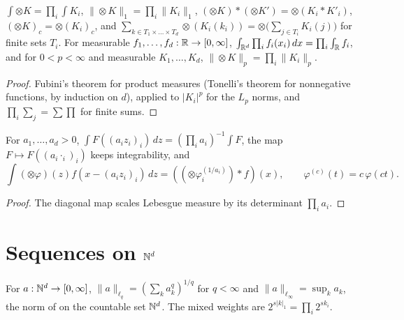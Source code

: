 \begin{lemma}
\label{lem:tensor-kernel-fubini}
\leanok
{}
$\int \otimes K = \prod_i \int K_i$, $\|\otimes K\|_1 = \prod_i \|K_i\|_1$,
$(\otimes K) * (\otimes K') = \otimes (K_i * K'_i)$, $(\otimes K)_c = \otimes (K_i)_c$, and
$\sum_{k \in T_1 \times \dots \times T_d} \otimes (K_i(k_i)) = \otimes \bigl(\sum_{j \in T_i} K_i(j)\bigr)$
for finite sets $T_i$. For measurable $f_1, \dots, f_d : \mathbb{R} \to [0, \infty]$,
$\int_{\mathbb{R}^d} \prod_i f_i(x_i) \, dx = \prod_i \int_{\mathbb{R}} f_i$, and for $0 < p < \infty$ and
measurable $K_1, \dots, K_d$, $\|\otimes K\|_p = \prod_i \|K_i\|_p$.
\end{lemma}

\begin{proof}
\leanok
Fubini's theorem for product measures (Tonelli's theorem for nonnegative functions, by
induction on $d$), applied to $|K_i|^p$ for the $L_p$ norms, and $\prod_i \sum_j = \sum \prod$
for finite sums.
\end{proof}

\begin{lemma}
\label{lem:diagonal-substitution}
\leanok
{}
For $a_1, \dots, a_d > 0$, $\int F((a_i z_i)_i) \, dz = (\prod_i a_i)^{-1} \int F$, the map
$F \mapsto F((a_i \cdot_i)_i)$ keeps integrability, and
\[
  \int (\otimes\varphi)(z) f(x - (a_i z_i)_i) \, dz = ((\otimes \varphi_i^{(1/a_i)}) * f)(x),
  \qquad \varphi^{(c)}(t) = c \, \varphi(ct).
\]
\end{lemma}

\begin{proof}
\leanok
The diagonal map scales Lebesgue measure by its determinant $\prod_i a_i$.
\end{proof}

\section{Sequences on \texorpdfstring{$\mathbb{N}^d$}{N\^{}d}}

\begin{definition}
\label{def:mixed-lq}
\leanok
{}
For $a : \mathbb{N}^d \to [0, \infty]$, $\|a\|_{\ell_q} = (\sum_k a_k^q)^{1/q}$ for $q < \infty$ and
$\|a\|_{\ell_\infty} = \sup_k a_k$, the norm of  on the countable set $\mathbb{N}^d$.
The mixed weights are $2^{s|k|_1} = \prod_i 2^{s k_i}$.
\end{definition}

